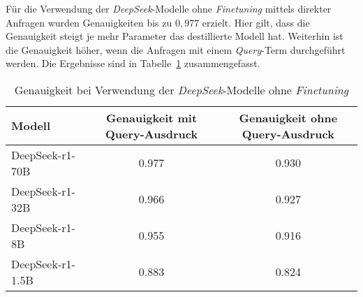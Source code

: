 Für die Verwendung der \textit{DeepSeek}-Modelle ohne \textit{Finetuning} mittels direkter Anfragen wurden Genauigkeiten bis zu $0,977$ erzielt.
Hier gilt, dass die Genauigkeit steigt je mehr Parameter das destillierte Modell hat.
Weiterhin ist die Genauigkeit höher, wenn die Anfragen mit einem \textit{Query}-Term durchgeführt werden.
Die Ergebnisse sind in Tabelle~\ref{tab:deepseek-results} zusammengefasst.
\begin{table}
    \center
    \begin{tabular}{lcc}
        \toprule
        Modell           & Genauigkeit mit Query-Ausdruck & Genauigkeit ohne Query-Ausdruck \\
        \midrule
        DeepSeek-r1-70B  & 0.977                           &  0.930                         \\
        DeepSeek-r1-32B  & 0.966                           &  0.927                         \\
        DeepSeek-r1-8B   & 0.955                           &  0.916                         \\
        DeepSeek-r1-1.5B & 0.883                           &  0.824                         \\
        \bottomrule
    \end{tabular}
    \caption{Genauigkeit bei Verwendung der \textit{DeepSeek}-Modelle ohne \textit{Finetuning}}
    \label{tab:deepseek-results}
\end{table}
